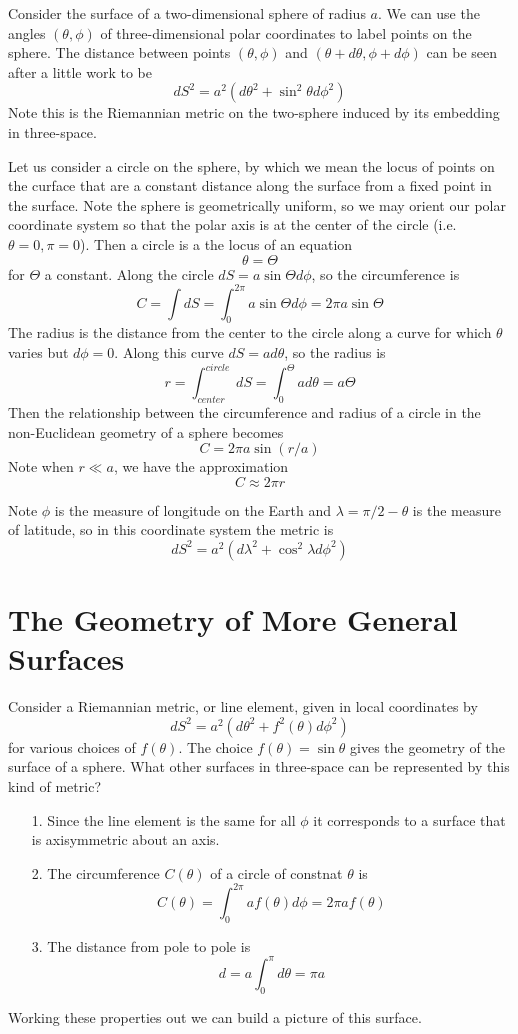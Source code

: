 Consider the surface of a two-dimensional sphere of radius $a$. We can use the angles $(\theta,\phi)$ of three-dimensional polar coordinates to label points on the sphere. The distance between points $(\theta,\phi)$ and $(\theta+d\theta,\phi+d\phi)$ can be seen after a little work to be $$dS^2 = a^2(d\theta^2+\sin^2\theta d\phi^2)$$
Note this is the Riemannian metric on the two-sphere induced by its embedding in three-space. 

Let us consider a circle on the sphere, by which we mean the locus of points on the curface that are a constant distance along the surface from a fixed point in the surface. Note the sphere is geometrically uniform, so we may orient our polar coordinate system so that the polar axis is at the center of the circle (i.e. $\theta = 0,\pi = 0$). Then a circle is a the locus of an equation $$\theta = \Theta$$ for $\Theta$ a constant. Along the circle $dS = a\sin\Theta d\phi$, so the circumference is $$C = \int dS = \int_{0}^{2\pi}a\sin\Theta d\phi = 2\pi a\sin\Theta$$
The radius is the distance from the center to the circle along a curve for which $\theta$ varies but $d\phi = 0$. Along this curve $dS = ad\theta$, so the radius is $$r = \int_{center}^{circle}dS = \int_0^{\Theta}ad\theta = a\Theta$$
Then the relationship between the circumference and radius of a circle in the non-Euclidean geometry of a sphere becomes $$C = 2\pi a\sin\left(r/a\right)$$
Note when $r \ll a$, we have the approximation $$C\approx 2\pi r$$

Note $\phi$ is the measure of longitude on the Earth and $\lambda = \pi/2-\theta$ is the measure of latitude, so in this coordinate system the metric is $$dS^2 = a^2(d\lambda^2+\cos^2\lambda d\phi^2)$$

\section{The Geometry of More General Surfaces}

Consider a Riemannian metric, or line element, given in local coordinates by $$dS^2 = a^2(d\theta^2+f^2(\theta)d\phi^2)$$
for various choices of $f(\theta)$. The choice $f(\theta) = \sin\theta$ gives the geometry of the surface of a sphere. What other surfaces in three-space can be represented by this kind of metric? \begin{enumerate}
    \item[1.] Since the line element is the same for all $\phi$ it corresponds to a surface that is axisymmetric about an axis.
    \item[2.] The circumference $C(\theta)$ of a circle of constnat $\theta$ is $$C(\theta) = \int_0^{2\pi}af(\theta)d\phi = 2\pi a f(\theta)$$
    \item[3.] The distance from pole to pole is $$d = a\int_0^{\pi}d\theta = \pi a$$
\end{enumerate}
Working these properties out we can build a picture of this surface.

